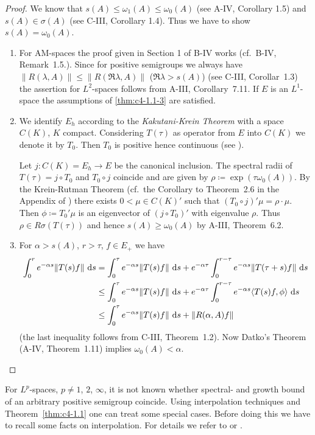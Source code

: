 \begin{proof}
We know that $s(A) \leq \omega_{1}(A) \leq \omega_{0}(A)$ (see A-IV, Corollary 1.5) and $s(A) \in \sigma(A)$ (see C-III, Corollary 1.4).
Thus we have to show $s(A) = \omega_{0}(A)$.

\begin{enumerate}[\upshape (i), wide, labelindent=.5em]
\item 
For AM-spaces the proof given in Section 1 of B-IV works (cf.\ B-IV, Remark~1.5.).
Since for positive semigroups we always have $\|R(\lambda,A)\| \leq \|R(\Re \lambda, A)\|$ ($\Re \lambda > s(A)$) (see C-III, Corollar~1.3) the assertion for $L^{2}$-spaces follows from A-III, Corollary~7.11.
If $E$ is an $L^{1}$-space the assumptions of  \ref{thm:c4-1.1-3} are satisfied.

\item 
We identify $E_{h}$ according to the \emph{Kakutani-Krein Theorem} with a space $C(K)$, $K$ compact.
Considering $T(\tau)$ as operator from $E$ into $C(K)$ we denote it by $T_{0}$.
Then $T_{0}$ is positive hence continuous (see \citet[Theorem~5.3]{schaefer:1974}).

Let $j \colon C(K) = E_{h} \to E$ be the canonical inclusion.
The spectral radii of $T(\tau) = j \circ T_{0}$ and $T_{0} \circ j$ coincide and are given by $\rho \coloneq  \exp(\tau \omega_{0}(A))$.
By the Krein-Rutman Theorem (cf.\ the Corollary to Theorem~2.6 in the Appendix of \citet{schaefer:1966}) there exists $0 < \mu \in C(K)'$ such that $(T_{0} \circ j)'\mu = \rho \cdot \mu$.
Then $\phi \coloneq  T_{0}'\mu$ is an eigenvector of $(j \circ T_{0})'$ with eigenvalue $\rho$.
Thus $\rho \in R\sigma(T(\tau))$ and hence $s(A) \geq \omega_{0}(A)$ by A-III, Theorem~6.2.

\item
For $\alpha > s(A)$, $r > \tau$, $f \in E_{+}$ we have
\begin{align*}
\int_{0}^{r} e^{-\alpha s}\|T(s)f\| \, \mathop{}\!\mathrm{d}{s} &= \int_{0}^{\tau} e^{-\alpha s}\|T(s)f\| \, \mathop{}\!\mathrm{d}{s} + e^{-\alpha \tau}\int_{0}^{r-\tau} e^{-\alpha s}\|T(\tau+s)f\| \, \mathop{}\!\mathrm{d}{s} \\
&\leq \int_{0}^{\tau} e^{-\alpha s}\|T(s)f\| \, \mathop{}\!\mathrm{d}{s} + e^{-\alpha \tau}\int_{0}^{r-\tau} e^{-\alpha s}\langle T(s)f,\phi \rangle \, \mathop{}\!\mathrm{d}{s} \\
&\leq \int_{0}^{\tau} e^{-\alpha s}\|T(s)f\| \, \mathop{}\!\mathrm{d}{s} + \|R(\alpha,A)f\|
\end{align*}
(the last inequality follows from C-III, Theorem~1.2).
Now Datko's Theorem (A-IV, Theorem~1.11) implies $\omega_{0}(A) < \alpha$.
\end{enumerate}
\end{proof}
For $L^{p}$-spaces, $p \neq 1$, $2$, $\infty$, it is not known whether spectral- and growth bound of an arbitrary positive semigroup coincide.
Using interpolation techniques and  Theorem~\ref{thm:c4-1.1}  one can treat some special cases.
Before doing this we have to recall some facts on interpolation.
For details we refer to 
\citet[VI.10]{dunfordschwartz:1958} or \citet[IX.4.]{reedsimon:1975}.

